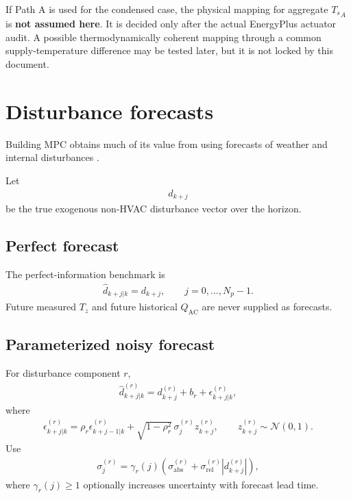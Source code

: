 \documentclass[11pt]{article}
\newcommand{\Ts}{T_s}
\newcommand{\Tz}{T_z}
\newcommand{\QAC}{Q_{\mathrm{AC}}}
\begin{document}
If Path A is used for the condensed case, the physical mapping for aggregate \({\Ts}_A\) is
\textbf{not assumed here}.  It is decided only after the actual EnergyPlus actuator audit.  A
possible thermodynamically coherent mapping through a common supply-temperature difference may
be tested later, but it is not locked by this document.

\section{Disturbance forecasts}

Building MPC obtains much of its value from using forecasts of weather and internal disturbances
\citep{killian2016ten,oldewurtel2014stochastic,drgona2020all}.

Let
\begin{align}
d_{k+j}
\end{align}
be the true exogenous non-HVAC disturbance vector over the horizon.

\subsection{Perfect forecast}

The perfect-information benchmark is
\begin{align}
\boxed{
\widehat d_{k+j|k}
=
d_{k+j},
\qquad
j=0,\ldots,N_p-1.
}
\tag{6.42}
\end{align}
Future measured \(\Tz\) and future historical \(\QAC\) are never supplied as forecasts.

\subsection{Parameterized noisy forecast}

For disturbance component \(r\),
\begin{align}
\widehat d^{(r)}_{k+j|k}
=
d^{(r)}_{k+j}
+
b_r
+
\epsilon^{(r)}_{k+j|k},
\tag{6.43}
\end{align}
where
\begin{align}
\epsilon^{(r)}_{k+j|k}
=
\rho_r\epsilon^{(r)}_{k+j-1|k}
+
\sqrt{1-\rho_r^2}\,
\sigma^{(r)}_j
z^{(r)}_{k+j},
\qquad
z^{(r)}_{k+j}\sim\mathcal N(0,1).
\tag{6.44}
\end{align}
Use
\begin{align}
\sigma^{(r)}_j
=
\gamma_r(j)
\left(
\sigma^{(r)}_{\mathrm{abs}}
+
\sigma^{(r)}_{\mathrm{rel}}
|d^{(r)}_{k+j}|
\right),
\tag{6.45}
\end{align}
where \(\gamma_r(j)\ge1\) optionally increases uncertainty with forecast lead time.
\end{document}

